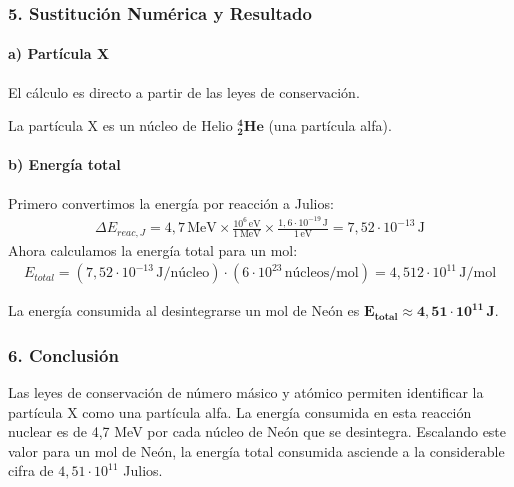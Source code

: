 \subsubsection*{5. Sustitución Numérica y Resultado}
\paragraph*{a) Partícula X}
El cálculo es directo a partir de las leyes de conservación.
\begin{cajaresultado}
    La partícula X es un núcleo de Helio $\boldsymbol{{}_{2}^{4}\text{He}}$ (una partícula alfa).
\end{cajaresultado}

\paragraph*{b) Energía total}
Primero convertimos la energía por reacción a Julios:
\begin{gather}
    \Delta E_{reac, J} = 4,7\,\text{MeV} \times \frac{10^6\,\text{eV}}{1\,\text{MeV}} \times \frac{1,6\cdot10^{-19}\,\text{J}}{1\,\text{eV}} = 7,52 \cdot 10^{-13}\,\text{J}
\end{gather}
Ahora calculamos la energía total para un mol:
\begin{gather}
    E_{total} = (7,52 \cdot 10^{-13}\,\text{J/núcleo}) \cdot (6\cdot10^{23}\,\text{núcleos/mol}) = 4,512 \cdot 10^{11}\,\text{J/mol}
\end{gather}
\begin{cajaresultado}
    La energía consumida al desintegrarse un mol de Neón es $\boldsymbol{E_{total} \approx 4,51 \cdot 10^{11}\,\textbf{J}}$.
\end{cajaresultado}

\subsubsection*{6. Conclusión}
\begin{cajaconclusion}
Las leyes de conservación de número másico y atómico permiten identificar la partícula X como una partícula alfa. La energía consumida en esta reacción nuclear es de 4,7 MeV por cada núcleo de Neón que se desintegra. Escalando este valor para un mol de Neón, la energía total consumida asciende a la considerable cifra de $4,51 \cdot 10^{11}$ Julios.
\end{cajaconclusion}
\newpage
